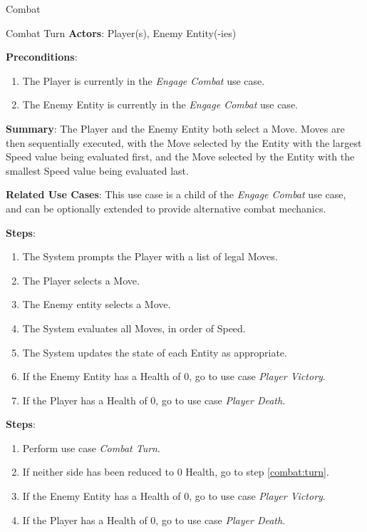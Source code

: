 \documentclass[12pt]{report}
\begin{document}
\begin{section}{Combat}
\begin{subsection}{Combat Turn}
      \textbf{Actors}:
      Player(s), Enemy Entity(-ies)

      \textbf{Preconditions}:
      \begin{enumerate}
        \item The Player is currently in the \textit{Engage Combat} use case.
        \item The Enemy Entity is currently in the \textit{Engage Combat} use case.
      \end{enumerate}

      \textbf{Summary}:
      The Player and the Enemy Entity both select a Move. Moves are then
      sequentially executed, with the Move selected by the Entity with the
      largest Speed value being evaluated first, and the Move selected by the
      Entity with the smallest Speed value being evaluated last.

      \textbf{Related Use Cases}:
      This use case is a child of the \textit{Engage Combat} use case, and can be
      optionally extended to provide alternative combat mechanics.

      \textbf{Steps}:
      \begin{enumerate}
        \item The System prompts the Player with a list of legal Moves.
        \item The Player selects a Move.
        \item The Enemy entity selects a Move.
        \item The System evaluates all Moves, in order of Speed.
        \item The System updates the state of each Entity as appropriate.
        \item If the Enemy Entity has a Health of 0, go to use case \textit{Player Victory}.
        \item If the Player has a Health of 0, go to use case \textit{Player Death}.
      \end{enumerate}
    \end{subsection} 

      \textbf{Steps}:
      \begin{enumerate}

        \item \label{combat:turn} Perform use case \textit{Combat Turn}.
        \item If neither side has been reduced to 0 Health,
	       go to step \ref{combat:turn}.
        \item If the Enemy Entity has a Health of 0, go to use case \textit{Player Victory}.
        \item If the Player has a Health of 0, go to use case \textit{Player Death}.
      \end{enumerate}



\end{section}
\end{document}
